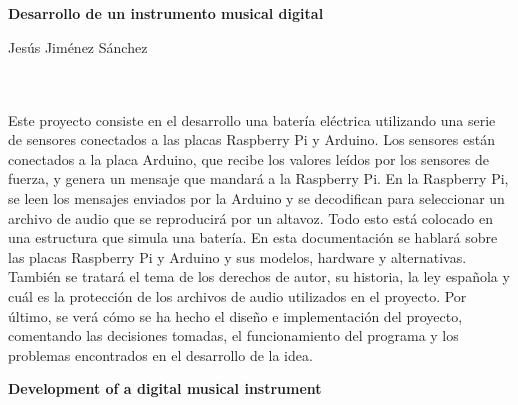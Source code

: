
\chapter*{}   %

\cleardoublepage
\thispagestyle{empty}

\begin{center}
    {\large\bfseries Desarrollo de un instrumento musical digital}\\
\end{center}

\begin{center}
    Jesús Jiménez Sánchez\\
\end{center}

\\

\vspace{0.7cm}
\\

Este proyecto consiste en el desarrollo una batería eléctrica utilizando una serie de sensores conectados a las placas
Raspberry Pi y Arduino.
Los sensores están conectados a la placa Arduino, que recibe los valores leídos por los sensores de fuerza, y genera un
mensaje que mandará a la Raspberry Pi.
En la Raspberry Pi, se leen los mensajes enviados por la Arduino y se decodifican para seleccionar un archivo de audio
que se reproducirá por un altavoz.
Todo esto está colocado en una estructura que simula una batería.
En esta documentación se hablará sobre las placas Raspberry Pi y Arduino y sus modelos, hardware y alternativas. También
se tratará el tema de los derechos de autor, su historia, la ley española y cuál es la protección de los archivos de
audio utilizados en el proyecto.
Por último, se verá cómo se ha hecho el diseño e implementación del proyecto, comentando las decisiones tomadas, el
funcionamiento del programa y los problemas encontrados en el desarrollo de la idea.

\cleardoublepage

\thispagestyle{empty}

\begin{center}
       {\large\bfseries Development of a digital musical instrument}\\
\end{center}

